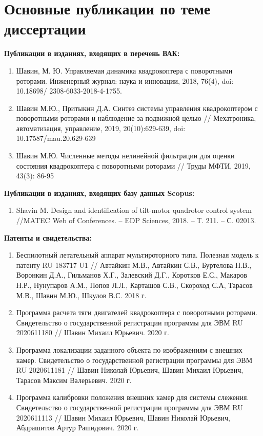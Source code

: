 \chapter{Основные публикации по теме диссертации}

\setlength{\parindent}{0mm}
\textbf{Публикации в изданиях, входящих в перечень ВАК:}

\begin{enumerate}
	
	\item Шавин, М. Ю. Управляемая динамика квадрокоптера с поворотными роторами. Инженерный журнал: наука и инновации, 2018, 76(4), doi: 10.18698/ 2308-6033-2018-4-1755.
	
	\item  Шавин М.Ю., Притыкин Д.А. Синтез системы управления квадрокоптером с поворотными роторами и наблюдение за подвижной целью // Мехатроника, автоматизация, управление, 2019, 20(10):629-639, doi:\\ 10.17587/mau.20.629-639
	
	\item  Шавин М.Ю. Численные методы нелинейной фильтрации для оценки состояния квадрокоптера с   поворотными роторами // Труды МФТИ, 2019, 43(3): 86-95
\end{enumerate}
\textbf{Публикации в изданиях, входящих базу данных Scopus:}
\begin{enumerate}
		\item Shavin M. Design and identification of tilt-motor quadrotor control system //MATEC Web of Conferences. – EDP Sciences, 2018. – Т. 211. – С. 02013.
\end{enumerate}

\textbf{Патенты и свидетельства:}
\begin{enumerate}
	\item Беспилотный летательный аппарат мультироторного типа. Полезная модель к патенту RU 183717 U1 //
	Автайкин М.В., Автайкин С.В., Буртелова Н.В.,
	Воронкин Д.А., Гильманов Х.Г., Залевский Д.Г.,
	Коротков Е.С., Макаров Н.Р., Нунупаров А.М.,
	Попов Л.Л., Карташов С.В., Скороход С.А,
	Тарасов М.В., Шавин М.Ю., Шкулов В.С. 2018 г.
	
	\item Программа расчета тяги двигателей квадрокоптера с поворотными роторами. Свидетельство о государственной регистрации программы для ЭВМ RU 2020611180 // Шавин Михаил Юрьевич. 2020 г.
	
	\item Программа локализации заданного объекта по изображениям с внешних камер. Свидетельство о государственной регистрации программы для ЭВМ RU 2020611181 // Шавин Николай Юрьевич, Шавин Михаил Юрьевич, Тарасов Максим Валерьевич. 2020 г.
	
	\item Программа калибровки положения внешних камер для системы слежения. Свидетельство о государственной регистрации программы для ЭВМ  RU 2020611113 // Шавин Михаил Юрьевич, Шавин Николай Юрьевич, Абдрашитов Артур Рашидович. 2020 г.
\end{enumerate}

